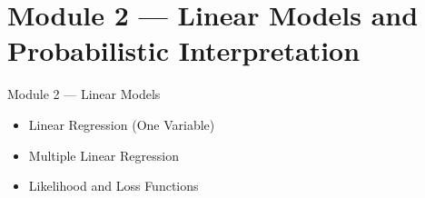\documentclass{beamer}
\begin{document}

    
    


\section{Module 2 — Linear Models and Probabilistic Interpretation}

\begin{frame}{Module 2 — Linear Models}
\begin{itemize}
    \item Linear Regression (One Variable)
    \item Multiple Linear Regression
    \item Likelihood and Loss Functions
\end{itemize}
\end{frame}
\end{document}
